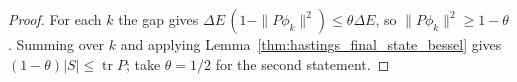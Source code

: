 \begin{proof}
    \leanok
    For each $k$ the gap gives
    $\Delta E\,(1-\|P\phi_k\|^2)\le\theta\Delta E$, so
    $\|P\phi_k\|^2\ge1-\theta$. Summing over $k$ and applying
    Lemma~\ref{thm:hastings_final_state_bessel} gives
    $(1-\theta)|S|\le\operatorname{tr}P$; take $\theta=1/2$ for the second
    statement.
\end{proof}

